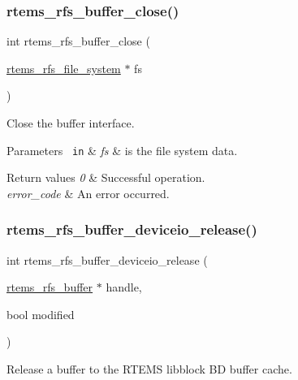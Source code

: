 \subsubsection{\texorpdfstring{rtems\_rfs\_buffer\_close()}{rtems\_rfs\_buffer\_close()}}
{\footnotesize\ttfamily int rtems\+\_\+rfs\+\_\+buffer\+\_\+close (\begin{DoxyParamCaption}\item[{\mbox{\hyperlink{struct__rtems__rfs__file__system}{rtems\+\_\+rfs\+\_\+file\+\_\+system}} $\ast$}]{fs }\end{DoxyParamCaption})}

Close the buffer interface.


\begin{DoxyParams}[1]{Parameters}
\mbox{\texttt{ in}}  & {\em fs} & is the file system data.\\
\hline
\end{DoxyParams}

\begin{DoxyRetVals}{Return values}
{\em 0} & Successful operation. \\
\hline
{\em error\+\_\+code} & An error occurred. \\
\hline
\end{DoxyRetVals}
\mbox{\label{rtems-rfs-buffer_8h_a93fca5a06bf0618e3ced9c3f1d167178}} 
\subsubsection{\texorpdfstring{rtems\_rfs\_buffer\_deviceio\_release()}{rtems\_rfs\_buffer\_deviceio\_release()}}
{\footnotesize\ttfamily int rtems\+\_\+rfs\+\_\+buffer\+\_\+deviceio\+\_\+release (\begin{DoxyParamCaption}\item[{\mbox{\hyperlink{struct__rtems__rfs__buffer}{rtems\+\_\+rfs\+\_\+buffer}} $\ast$}]{handle,  }\item[{bool}]{modified }\end{DoxyParamCaption})}

Release a buffer to the R\+T\+E\+MS libblock BD buffer cache. \mbox{\label{rtems-rfs-buffer_8h_ace9647e355198f86ffd4d637b9ddb900}} 
